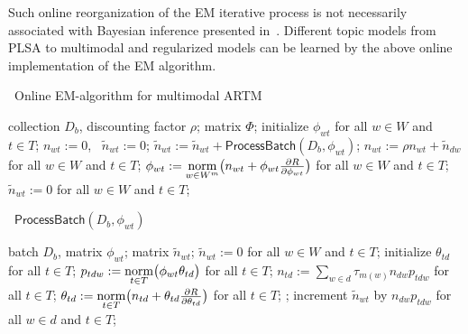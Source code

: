 \documentclass{llncs}
\newcommand{\norm}{\mathop{\rm norm}\limits}
\newcommand{\kw}[1]{\textsf{#1}}
\begin{document}
Such online reorganization of the EM iterative process 
is not necessarily associated with Bayesian inference presented in~\cite{hoffman10online}.
Different topic models from PLSA to multimodal and regularized models
can be learned by the above online implementation of the EM algorithm.

\begin{algorithm}[t]
\caption{~Online EM-algorithm for multimodal ARTM}
\label{alg:Online}
\begin{algorithmic}[1]
\REQUIRE collection $D_b$, discounting factor $\rho$;
\ENSURE matrix $\Phi$;
\STATE initialize $\phi_{wt}$ for all $w \in W$ and $t \in T$;
\STATE $n_{wt} := 0$,~ $\tilde n_{wt} := 0$;
    \STATE $\tilde n_{wt} := \tilde n_{wt} + \kw{ProcessBatch}(D_b, \phi_{wt})$;
        \STATE \label{alg:merging}
               $n_{wt} := \rho n_{wt} + \tilde n_{dw}$ for all $w \in W$ and $t \in T$;
        \STATE \label{alg:phi}
               $\phi_{wt} := \norm_{w\in W^m}
                    \bigl(
                        n_{wt} + \phi_{wt} \frac{\partial R}{\partial \phi_{wt}}
                    \bigr)$ for all $w \in W$ and $t \in T$;
        \STATE $\tilde n_{wt} := 0$ for all $w \in W$ and $t \in T$;
    \ENDIF
\ENDFOR
\end{algorithmic}
\end{algorithm}

\begin{algorithm}[t]
\caption{~$\kw{ProcessBatch} (D_b, \phi_{wt})$}
\label{alg:ProcessBatch}
\begin{algorithmic}[1]
\REQUIRE batch $D_b$, matrix $\phi_{wt}$;
\ENSURE matrix $\tilde n_{wt}$;
\STATE $\tilde n_{wt} := 0$ for all $w \in W$ and $t \in T$;
	\STATE initialize $\theta_{td}$ for all $t \in T$;
	\REPEAT
        \STATE $p_{tdw} := \norm_{t\in T} \bigl(\phi_{wt}\theta_{td}\bigr)$ for all $t \in T$;
        \STATE $n_{td} := \sum_{w\in d} \tau_{m(w)} n_{dw} p_{tdw}$ for all $t \in T$;
        \STATE $\theta_{td} := \norm_{t\in T}
                    \bigl(
                        n_{td} + \theta_{td} \frac{\partial R}{\partial \theta_{td}}
                    \bigr)$ for all $t \in T$;
	;
	\STATE increment $\tilde n_{wt}$ by $n_{dw} p_{tdw}$ for all $w \in d$ and $t \in T$;
\ENDFOR
\end{algorithmic}
\end{algorithm}
\end{document}
